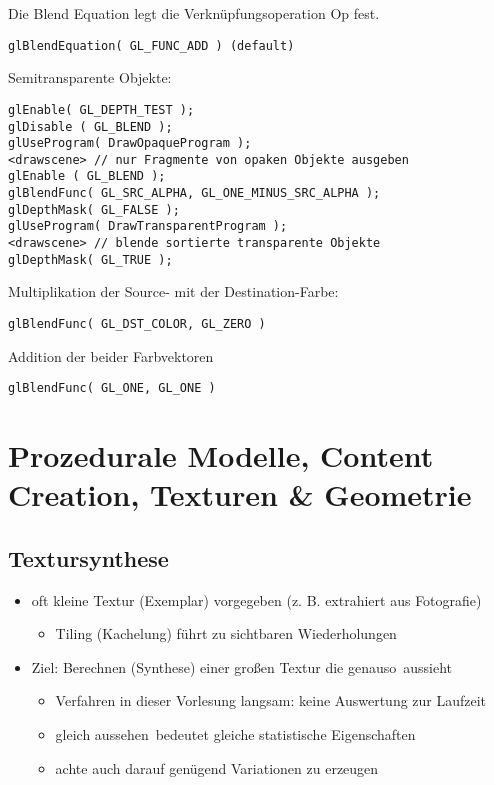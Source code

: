 \documentclass[paper=a4, fontsize=11pt]{scrartcl} %
\numberwithin{equation}{section} %
\numberwithin{figure}{section} %
\numberwithin{table}{section} %
\begin{document}
Die Blend Equation legt die Verknüpfungsoperation Op fest.
\begin{lstlisting}
glBlendEquation( GL_FUNC_ADD ) (default)
\end{lstlisting}

Semitransparente Objekte:
\begin{lstlisting}
glEnable( GL_DEPTH_TEST );
glDisable ( GL_BLEND );
glUseProgram( DrawOpaqueProgram );
<drawscene> // nur Fragmente von opaken Objekte ausgeben
glEnable ( GL_BLEND );
glBlendFunc( GL_SRC_ALPHA, GL_ONE_MINUS_SRC_ALPHA ); 
glDepthMask( GL_FALSE );
glUseProgram( DrawTransparentProgram );
<drawscene> // blende sortierte transparente Objekte 
glDepthMask( GL_TRUE );
\end{lstlisting}

Multiplikation der Source- mit der Destination-Farbe:
\begin{lstlisting}
glBlendFunc( GL_DST_COLOR, GL_ZERO )
\end{lstlisting}

Addition der beider Farbvektoren
\begin{lstlisting}
glBlendFunc( GL_ONE, GL_ONE )
\end{lstlisting}

\section{Prozedurale Modelle, Content Creation, Texturen \& Geometrie}

\subsection{Textursynthese}

\begin{itemize}
\item oft kleine Textur (Exemplar) vorgegeben (z. B. extrahiert aus Fotografie)
\begin{itemize}
\item Tiling (Kachelung) führt zu sichtbaren Wiederholungen
\end{itemize}
\item Ziel: Berechnen (Synthese) einer großen Textur die \glqq genauso\grqq\ aussieht
\begin{itemize}
\item Verfahren in dieser Vorlesung langsam: keine Auswertung zur Laufzeit
\item \glqq gleich aussehen\grqq\ bedeutet \glqq gleiche statistische Eigenschaften\grqq
\item achte auch darauf genügend Variationen zu erzeugen
\end{itemize}
\end{itemize}
\end{document}
